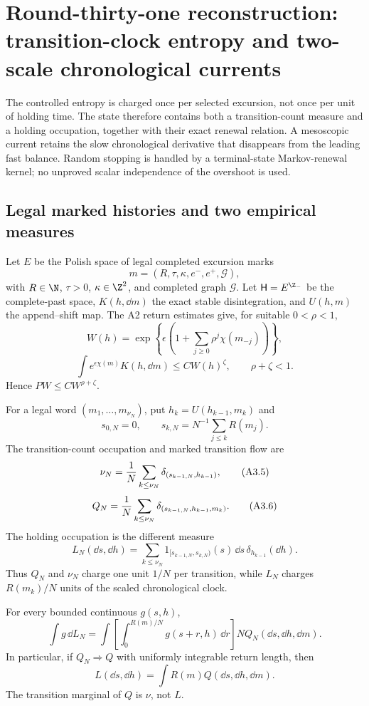 \section{Round-thirty-one reconstruction: transition-clock entropy and two-scale chronological currents}
\label{sec:r31-a3}

The controlled entropy is charged once per selected excursion, not once per
unit of holding time.  The state therefore contains both a transition-count
measure and a holding occupation, together with their exact renewal relation.
A mesoscopic current retains the slow chronological derivative that disappears
from the leading fast balance.  Random stopping is handled by a terminal-state
Markov-renewal kernel; no unproved scalar independence of the overshoot is
used.

\subsection{Legal marked histories and two empirical measures}

Let $E$ be the Polish space of legal completed excursion marks
\[
 m=(R,\tau,\kappa,e^-,e^+,\mathcal G),                    \tag{A3.1}
\]
with $R\in\N$, $\tau>0$, $\kappa\in\Z^2$, and completed graph
$\mathcal G$.  Let $\mathsf H=E^{\Z_-}$ be the complete-past space,
$K(h,\dd m)$ the exact stable disintegration, and $U(h,m)$ the append--shift
map.  The A2 return estimates give, for suitable $0<\rho<1$,
\[
 W(h)=\exp\left\{\epsilon\left(1+
 \sum_{j\ge0}\rho^j\chi(m_{-j})\right)\right\},           \tag{A3.2}
\]
\[
 \int e^{\epsilon\chi(m)}K(h,\dd m)\le C W(h)^\zeta,
 \qquad \rho+\zeta<1.                                    \tag{A3.3}
\]
Hence $PW\le C W^{\rho+\zeta}$.

For a legal word $(m_1,\ldots,m_{\nu_N})$, put
$h_k=U(h_{k-1},m_k)$ and
\[
 s_{0,N}=0,\qquad s_{k,N}=N^{-1}\sum_{j\le k}R(m_j).       \tag{A3.4}
\]
The transition-count occupation and marked transition flow are
\[
 \nu_N={1\over N}\sum_{k\le\nu_N}
       \delta_{(s_{k-1,N},h_{k-1})},                      \tag{A3.5}
\]
\[
 Q_N={1\over N}\sum_{k\le\nu_N}
       \delta_{(s_{k-1,N},h_{k-1},m_k)}.                  \tag{A3.6}
\]
The holding occupation is the different measure
\[
 L_N(\dd s,\dd h)=
 \sum_{k\le\nu_N}
  1_{[s_{k-1,N},s_{k,N})}(s)\,\dd s\,\delta_{h_{k-1}}(\dd h).           \tag{A3.7}
\]
Thus $Q_N$ and $\nu_N$ charge one unit $1/N$ per transition, while $L_N$
charges $R(m_k)/N$ units of the scaled chronological clock.

\begin{proposition}
\label{prop:r31-a3-renewal-relation}
For every bounded continuous $g(s,h)$,
\begin{equation}\tag{A3.8}
 \int g\,\dd L_N
 =\int\left[\int_0^{R(m)/N}g(s+r,h)\,\dd r\right]
    NQ_N(\dd s,\dd h,\dd m).
\end{equation}
In particular, if $Q_N\Rightarrow Q$ with uniformly integrable return length,
then
\[
 L(\dd s,\dd h)=\int R(m)Q(\dd s,\dd h,\dd m).            \tag{A3.9}
\]
The transition marginal of $Q$ is $\nu$, not $L$.
\end{proposition}

